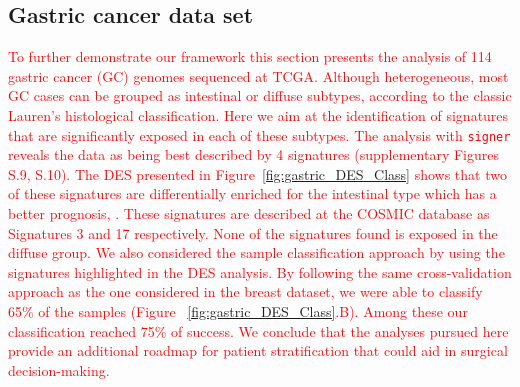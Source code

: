 \documentclass{bioinfo}
\begin{document}
\subsection{Gastric cancer data set}
\textcolor{red}{
To further demonstrate our framework this section presents the analysis of 114 gastric cancer (GC) genomes sequenced at TCGA. Although heterogeneous, most GC cases can be grouped as intestinal or diffuse subtypes, according to the classic Lauren's histological classification. Here we aim at the identification of
signatures that are significantly exposed in each of these subtypes.
The analysis with \texttt{signer} reveals the data as being best described by 4 signatures (supplementary Figures S.9, S.10). The DES presented in Figure~\ref{fig:gastric_DES_Class} shows that two of these signatures are differentially enriched for the intestinal type which has a better prognosis, \cite{MSKZ}.
These signatures are described at the COSMIC database
as Signatures 3 and 17 respectively. None of the signatures found is exposed
in the diffuse group. We also considered the sample classification approach by using the signatures highlighted in the DES analysis. By following the same cross-validation  approach as the one considered in  the breast dataset, we were able to classify 65\% of the samples (Figure ~\ref{fig:gastric_DES_Class}.B).  Among these our classification reached 75\% of success. We conclude that the analyses pursued here provide an additional roadmap for patient stratification that could aid in surgical decision-making.
}
\end{document}
